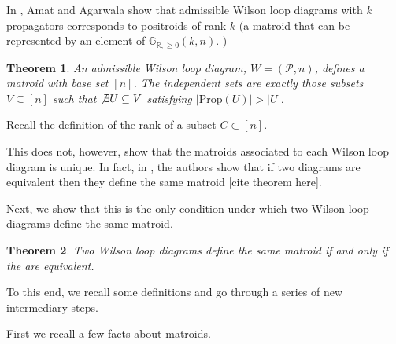 \documentclass[11pt]{article}
\newcommand{\R}{\mathbb{R}}
\newcommand{\Gr}{\mathbb{G}_{\R, \geq 0}}
\newcommand{\cP}{\mathcal{P}}
\newcommand{\Prop}{\textrm{Prop}}
\newtheorem{thm}{Theorem}[section]
\theoremstyle{remark}
\theoremstyle{definition}
\begin{document}
In \cite{wilsonloop}, Amat and Agarwala show that admissible Wilson loop diagrams with $k$ propagators corresponds to positroids of rank $k$ (a matroid that can be represented by an element of $\Gr(k, n)$. )

\begin{thm}\cite{wilsonloop}An admissible Wilson loop diagram, $W =(\cP, n)$, defines a matroid with base set $[n]$. The independent sets are exactly those subsets $V \subseteq [n]$ such that $\not \exists U\subseteq V$ satisfying $|\Prop(U)|> |U|$. \label{thm:WLDmatroid}\end{thm}

Recall the definition of the rank of a subset $C \subset [n]$.

This does not, however, show that the matroids associated to each Wilson loop diagram is unique. In fact, in \cite{wilsonloop}, the authors show that if two diagrams are equivalent then they define the same matroid [cite theorem here].

Next, we show that this is the only condition under which two Wilson loop diagrams define the same matroid.

\begin{thm}
Two Wilson loop diagrams define the same matroid if and only if the are equivalent.
\end{thm}

To this end, we recall some definitions and go through a series of new intermediary steps.

First we recall a few facts about matroids.
\end{document}
